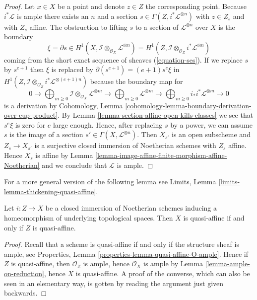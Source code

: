 \begin{proof}
\medskip\noindent
Let $x \in X$ be a point and denote $z \in Z$ the corresponding point.
Because $i^*\mathcal{L}$ is ample there exists an $n$ and a section
$s \in \Gamma(Z, i^*\mathcal{L}^{\otimes n})$ with $z \in Z_s$
and with $Z_s$ affine. The obstruction to lifting $s$ to a section
of $\mathcal{L}^{\otimes n}$ over $X$ is the boundary
$$
\xi = \partial s \in
H^1(X, \mathcal{I} \otimes_{\mathcal{O}_X} \mathcal{L}^{\otimes n}) =
H^1(Z, \mathcal{I} \otimes_{\mathcal{O}_Z} i^*\mathcal{L}^{\otimes n})
$$
coming from the short exact sequence of sheaves (\ref{equation-ses}).
If we replace $s$ by $s^{e + 1}$ then $\xi$ is replaced by
$\partial(s^{e + 1}) = (e + 1) s^e \xi$ in
$H^1(Z, \mathcal{I} \otimes_{\mathcal{O}_Z} i^*\mathcal{L}^{\otimes (e + 1)n})$
because the boundary map for
$$
0 \to
\bigoplus\nolimits_{m \geq 0}
\mathcal{I} \otimes_{\mathcal{O}_X} \mathcal{L}^{\otimes m} \to
\bigoplus\nolimits_{m \geq 0}
\mathcal{L}^{\otimes m} \to
\bigoplus\nolimits_{m \geq 0}
i_*i^*\mathcal{L}^{\otimes m} \to 0
$$
is a derivation by Cohomology, Lemma
\ref{cohomology-lemma-boundary-derivation-over-cup-product}. By
Lemma \ref{lemma-section-affine-open-kills-classes}
we see that $s^e \xi$ is zero for $e$ large enough.
Hence, after replacing $s$ by a power, we can assume $s$ is the image
of a section $s' \in \Gamma(X, \mathcal{L}^{\otimes n})$.
Then $X_{s'}$ is an open subscheme and $Z_s \to X_{s'}$ is a surjective
closed immersion of Noetherian schemes with $Z_s$ affine. Hence
$X_s$ is affine by
Lemma \ref{lemma-image-affine-finite-morphism-affine-Noetherian} and
we conclude that $\mathcal{L}$ is ample.
\end{proof}

\noindent
For a more general version of the following lemma see
Limits, Lemma \ref{limits-lemma-thickening-quasi-affine}.

\begin{lemma}
\label{lemma-thickening-quasi-affine}
Let $i : Z \to X$ be a closed immersion of Noetherian schemes
inducing a homeomorphism of underlying topological spaces.
Then $X$ is quasi-affine if and only if $Z$ is quasi-affine.
\end{lemma}

\begin{proof}
Recall that a scheme is quasi-affine
if and only if the structure sheaf is ample, see
Properties, Lemma \ref{properties-lemma-quasi-affine-O-ample}.
Hence if $Z$ is quasi-affine, then $\mathcal{O}_Z$ is ample,
hence $\mathcal{O}_X$ is ample by
Lemma \ref{lemma-ample-on-reduction}, hence
$X$ is quasi-affine. A proof of the converse, which
can also be seen in an elementary way, is gotten by
reading the argument just given backwards.
\end{proof}


